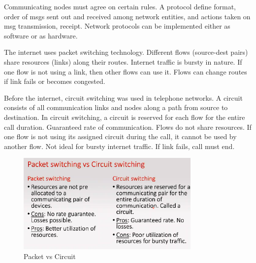 \documentclass[a4paper]{article}
\theoremstyle{plain}
\theoremstyle{definition}
\newtheorem{defn}{Definition}[section]
\theoremstyle{remark}
\begin{document}
\begin{tcolorbox}[colback=black!3!white,colframe=black!60!white,title=\begin{defn}Protocol \label{Protocol}\end{defn}]
Communicating nodes must agree on certain rules. A protocol define format, order of msgs sent out and received among network entities, and actions taken on msg transmission, receipt. Network protocols can be implemented either as software or as hardware.
\end{tcolorbox}
\begin{tcolorbox}[colback=black!3!white,colframe=black!60!white,title=\begin{defn}Packet Switching \label{Packet Switching}\end{defn}]
The internet uses packet switching technology. Different flows (source-dest pairs) share resources (links) along their routes. Internet traffic is bursty in nature. If one flow is not using a link, then other flows can use it. Flows can change routes if link fails or becomes congested.
\end{tcolorbox}
\begin{tcolorbox}[colback=black!3!white,colframe=black!60!white,title=\begin{defn}Circuit Switching \label{Circuit Switching}\end{defn}]
Before the internet, circuit switching was used in telephone networks. A circuit consists of all communication links and nodes along a path from source to destination. In circuit switching, a circuit is reserved for each flow for the entire call duration. Guaranteed rate of communication. Flows do not share resources. If one flow is not using its assigned circuit during the call, it cannot be used by another flow. Not ideal for bursty internet traffic. If link fails, call must end.
\end{tcolorbox}
\begin{figure}[H]
	\centering
	\includegraphics[width=0.8\textwidth]{twentyone.png}
	\caption{Packet vs Circuit}
	\label{fig:twentyone-png}
\end{figure}		
\end{document}
